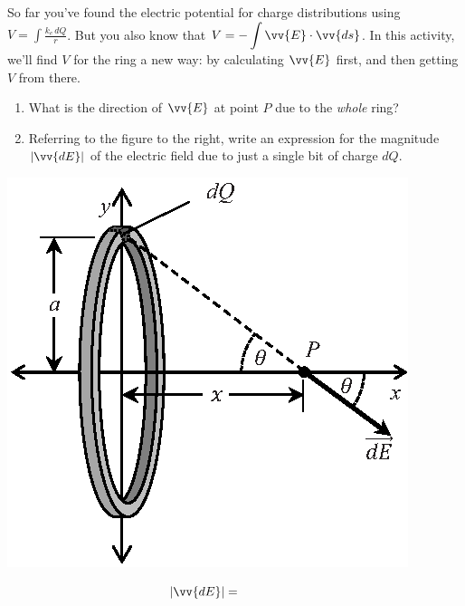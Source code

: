 \begin{minipage}{0.60\textwidth}
So far you've found the electric potential for charge distributions using 
$\displaystyle V=\int{\frac{k_e\,dQ}{r}}$.  
But you also know that 
$\displaystyle V=-\int{\vv{E} \cdot \vv{ds}}$.  
In this activity, we'll find $V$ for the ring a new way: by calculating $\vv{E}$ first, and then getting $V$ from there.

\begin{enumerate}[labparts]

\item What is the direction of $\vv{E}$ at point $P$ due to the \textit{whole} ring?
\answerspace{0.3in}

\item Referring to the figure to the right, write an expression for the magnitude $| \vv{dE} |$ of the electric field due to just a single bit of charge $dQ$.

\end{enumerate}
\end{minipage}
\begin{minipage}{0.39\textwidth}
\vspace{-0.3in}
\raggedleft \includegraphics[scale=1.0]{potential_charge_distributions/ring_E_field.eps}
\end{minipage}
$$| \vv{dE}|=\hspace{0.7in}$$
\answerspace{0.1in}

